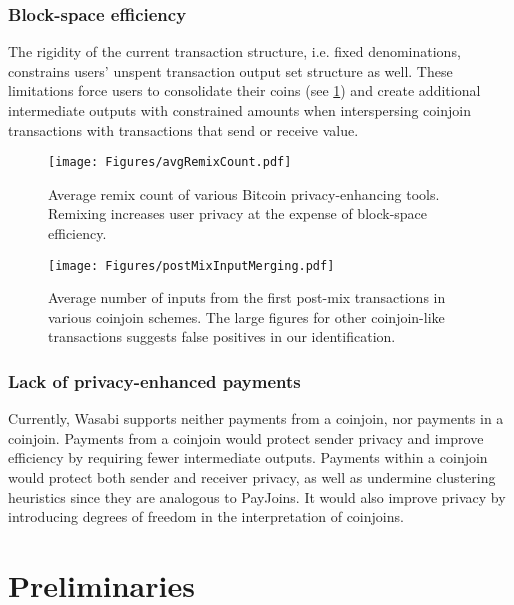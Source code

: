 \documentclass[a4paper]{article}
\begin{document}
\subsubsection{Block-space efficiency}

The rigidity of the current transaction structure, i.e. fixed denominations, constrains users' unspent transaction output set structure as well. These limitations force users to consolidate their coins (see \cref{fig:postmixmerging}) and create additional intermediate outputs with constrained amounts when interspersing coinjoin transactions with transactions that send or receive value.

\begin{figure}%
\centering
\begin{minipage}{.45\textwidth}
    \centering
    \texttt{[image: Figures/avgRemixCount.pdf]}
    \caption{Average remix count of various Bitcoin privacy-enhancing tools. Remixing increases user privacy at the expense of block-space efficiency. }
    \label{fig:remixcount}
\end{minipage}
\hspace{6pt}
\begin{minipage}{.45\textwidth}
    \centering
    \texttt{[image: Figures/postMixInputMerging.pdf]}
    \caption{Average number of inputs from the first post-mix transactions in various coinjoin schemes. The large figures for other coinjoin-like transactions suggests false positives in our identification.}
    \label{fig:postmixmerging}
\end{minipage}
\end{figure}

\subsubsection{Lack of privacy-enhanced payments} Currently, Wasabi supports neither payments from a coinjoin, nor payments in a coinjoin. Payments from a coinjoin would protect sender privacy and improve efficiency by requiring fewer intermediate outputs. Payments within a coinjoin would protect both sender and receiver privacy, as well as undermine clustering heuristics since they are analogous to PayJoins. It would also improve privacy by introducing degrees of freedom in the interpretation of coinjoins.




\section{Preliminaries}\label{sec:preliminaries}
\end{document}
